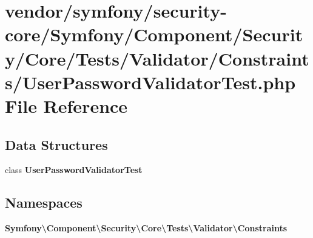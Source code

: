 \section{vendor/symfony/security-\/core/\+Symfony/\+Component/\+Security/\+Core/\+Tests/\+Validator/\+Constraints/\+User\+Password\+Validator\+Test.php File Reference}
\label{_user_password_validator_test_8php}
\subsection*{Data Structures}
\begin{DoxyCompactItemize}
\item 
class {\bf User\+Password\+Validator\+Test}
\end{DoxyCompactItemize}
\subsection*{Namespaces}
\begin{DoxyCompactItemize}
\item 
 {\bf Symfony\textbackslash{}\+Component\textbackslash{}\+Security\textbackslash{}\+Core\textbackslash{}\+Tests\textbackslash{}\+Validator\textbackslash{}\+Constraints}
\end{DoxyCompactItemize}
